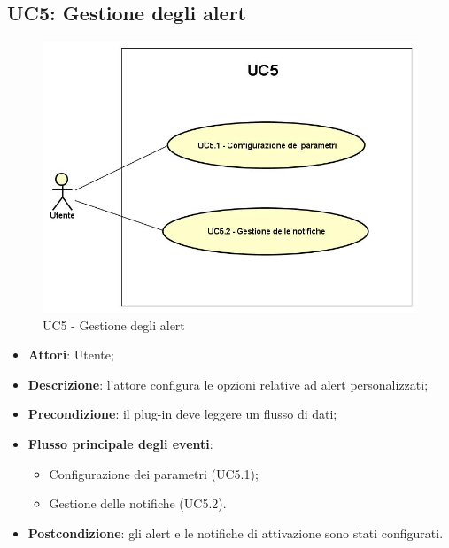 \subsection{UC5: Gestione degli alert}
\hypertarget{UC5}{}
\begin{figure} [H]
	\centering
	\includegraphics[scale=0.45]{Img/UC5}
	\caption{UC5 - Gestione degli alert}\label{}
\end{figure}
\begin{itemize}
	\item \textbf{Attori}: Utente;
	\item \textbf{Descrizione}: l'attore configura le opzioni relative ad alert personalizzati;
	\item \textbf{Precondizione}: il plug-in deve leggere un flusso di dati;
	\item \textbf{Flusso principale degli eventi}:
	\begin{itemize}
		\item Configurazione dei parametri (UC5.1);
		\item Gestione delle notifiche (UC5.2).
	\end{itemize}
	\item \textbf{Postcondizione}: gli alert e le notifiche di attivazione sono stati configurati.
\end{itemize}

